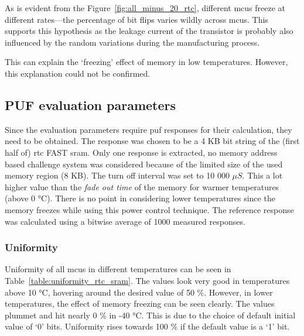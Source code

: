 As is evident from the Figure~\ref{fig:all_minus_20_rtc}, different \glspl{mcu} freeze at different rates---the percentage of bit flips varies wildly across \glspl{mcu}. This supports this hypothesis as the leakage current of the transistor is probably also influenced by the random variations during the manufacturing process.

This can explain the `freezing' effect of memory in low temperatures. However, this explanation could not be confirmed.

\subsection{PUF evaluation parameters}\label{sec:rtc_evaluation}

Since the evaluation parameters require \gls{puf} responses for their calculation, they need to be obtained. The response was chosen to be a 4 KB bit string of the (first half of) \gls{rtc} FAST \gls{sram}. Only one response is extracted, no memory address based challenge system was considered because of the limited size of the used memory region (8 KB). The turn off interval was set to 10 000 $\mu{}S$. This a lot higher value than the \emph{fade out time} of the memory for warmer temperatures (above 0 °C). There is no point in considering lower temperatures since the memory freezes while using this power control technique. The reference response was calculated using a bitwise average of 1000 measured responses.

\subsubsection*{Uniformity}

Uniformity of all \glspl{mcu} in different temperatures can be seen in Table~\ref{table:uniformity_rtc_sram}. The values look very good in temperatures above 10 °C, hovering around the desired value of 50 \%. However, in lower temperatures, the effect of memory freezing can be seen clearly. The values plummet and hit nearly 0 \% in -40 °C. This is due to the choice of default initial value of `0' bits. Uniformity rises towards 100 \% if the default value is a `1' bit.

